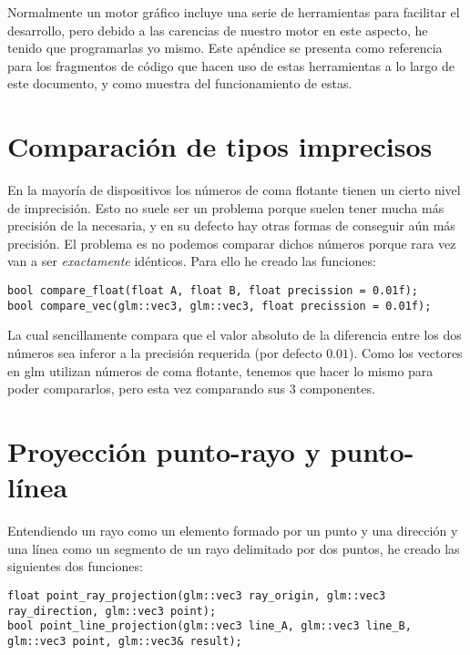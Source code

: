 Normalmente un motor gráfico incluye una serie de herramientas para facilitar el desarrollo, pero debido a las carencias de nuestro motor en este aspecto, he tenido que programarlas yo mismo. Este apéndice se presenta como referencia para los fragmentos de código que hacen uso de estas herramientas a lo largo de este documento, y como muestra del funcionamiento de estas.

\section{Comparación de tipos imprecisos}
En la mayoría de dispositivos los números de coma flotante tienen un cierto nivel de imprecisión. Esto no suele ser un problema porque suelen tener mucha más precisión de la necesaria, y en su defecto hay otras formas de conseguir aún más precisión. El problema es no podemos comparar dichos números porque rara vez van a ser \textit{exactamente} idénticos. Para ello he creado las funciones:

\begin{lstlisting}
bool compare_float(float A, float B, float precission = 0.01f);
bool compare_vec(glm::vec3, glm::vec3, float precission = 0.01f);
\end{lstlisting}

La cual sencillamente compara que el valor absoluto de la diferencia entre los dos números sea inferor a la precisión requerida (por defecto $0.01$). Como los vectores en glm utilizan números de coma flotante, tenemos que hacer lo mismo para poder compararlos, pero esta vez comparando sus 3 componentes.

\section{Proyección punto-rayo y punto-línea}
\label{sec:pointrayproj}
Entendiendo un rayo como un elemento formado por un punto y una dirección y una línea como un segmento de un rayo delimitado por dos puntos, he creado las siguientes dos funciones:

\begin{lstlisting}
float point_ray_projection(glm::vec3 ray_origin, glm::vec3 ray_direction, glm::vec3 point);
bool point_line_projection(glm::vec3 line_A, glm::vec3 line_B, glm::vec3 point, glm::vec3& result);
\end{lstlisting}

